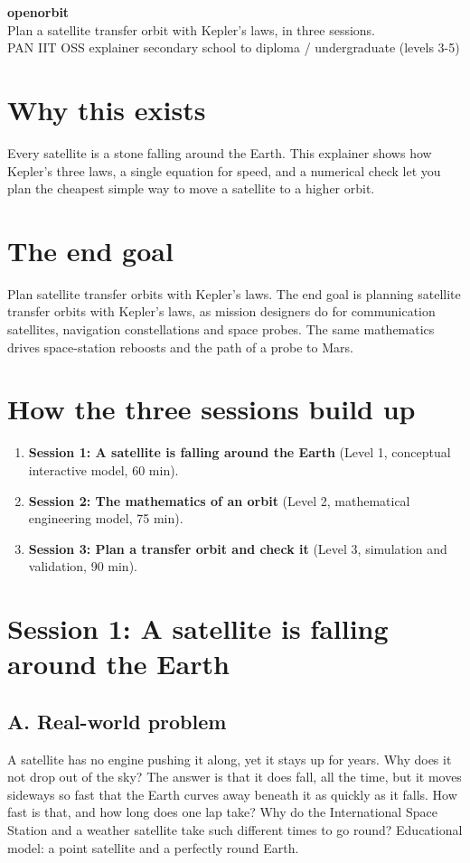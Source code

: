 \documentclass[11pt,a4paper]{article}
\begin{document}
\begin{center}{\LARGE\bfseries openorbit}\\[0.4em]{\large Plan a satellite transfer orbit with Kepler's laws, in three sessions.}\\[0.2em]\small PAN IIT OSS explainer \textbullet{} secondary school to diploma / undergraduate (levels 3-5)\end{center}

\section*{Why this exists}
Every satellite is a stone falling around the Earth. This explainer shows how Kepler's three laws, a single equation for speed, and a numerical check let you plan the cheapest simple way to move a satellite to a higher orbit.

\section*{The end goal}
Plan satellite transfer orbits with Kepler's laws. The end goal is planning satellite transfer orbits with Kepler's laws, as mission designers do for communication satellites, navigation constellations and space probes. The same mathematics drives space-station reboosts and the path of a probe to Mars.

\section*{How the three sessions build up}
\begin{enumerate}[nosep]
\item \textbf{Session 1: A satellite is falling around the Earth} (Level 1, conceptual interactive model, 60 min).
\item \textbf{Session 2: The mathematics of an orbit} (Level 2, mathematical engineering model, 75 min).
\item \textbf{Session 3: Plan a transfer orbit and check it} (Level 3, simulation and validation, 90 min).
\end{enumerate}

\section{Session 1: A satellite is falling around the Earth}

\subsection*{A. Real-world problem}
A satellite has no engine pushing it along, yet it stays up for years. Why does it not drop out of the sky? The answer is that it does fall, all the time, but it moves sideways so fast that the Earth curves away beneath it as quickly as it falls. How fast is that, and how long does one lap take? Why do the International Space Station and a weather satellite take such different times to go round? Educational model: a point satellite and a perfectly round Earth.
\end{document}
